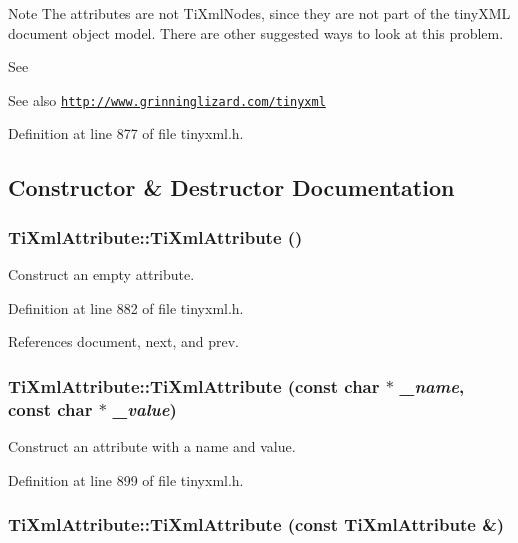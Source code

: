 \begin{DoxyNote}{Note}
The attributes are not TiXmlNodes, since they are not part of the tinyXML document object model. There are other suggested ways to look at this problem.
\end{DoxyNote}
See \begin{DoxySeeAlso}{See also}
\href{http://www.grinninglizard.com/tinyxml}{\tt http://www.grinninglizard.com/tinyxml} 
\end{DoxySeeAlso}


Definition at line 877 of file tinyxml.h.

\subsection{Constructor \& Destructor Documentation}
\hypertarget{class_ti_xml_attribute_a9cfa3c8179873fd485d83003b114f8e1}{
\subsubsection[{TiXmlAttribute}]{\setlength{\rightskip}{0pt plus 5cm}TiXmlAttribute::TiXmlAttribute ()}}
\label{class_ti_xml_attribute_a9cfa3c8179873fd485d83003b114f8e1}


Construct an empty attribute. 

Definition at line 882 of file tinyxml.h.

References document, next, and prev.\hypertarget{class_ti_xml_attribute_a759d0b76fb8fcf765ecab243bc14f05e}{
\subsubsection[{TiXmlAttribute}]{\setlength{\rightskip}{0pt plus 5cm}TiXmlAttribute::TiXmlAttribute (const char $\ast$ {\em \_\-name}, \/  const char $\ast$ {\em \_\-value})}}
\label{class_ti_xml_attribute_a759d0b76fb8fcf765ecab243bc14f05e}


Construct an attribute with a name and value. 

Definition at line 899 of file tinyxml.h.\hypertarget{class_ti_xml_attribute_aee53e434ace7271afc5ce51aeea0b400}{
\subsubsection[{TiXmlAttribute}]{\setlength{\rightskip}{0pt plus 5cm}TiXmlAttribute::TiXmlAttribute (const {\bf TiXmlAttribute} \&)}}
\label{class_ti_xml_attribute_aee53e434ace7271afc5ce51aeea0b400}


